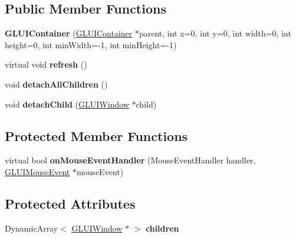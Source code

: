 \subsection*{Public Member Functions}
\begin{DoxyCompactItemize}
\item 
\hypertarget{classCartWheel_1_1GL_1_1GLUIContainer_ac18a8aafca75af543732db4666e20850}{
{\bfseries GLUIContainer} (\hyperlink{classCartWheel_1_1GL_1_1GLUIContainer}{GLUIContainer} $\ast$parent, int x=0, int y=0, int width=0, int height=0, int minWidth=-\/1, int minHeight=-\/1)}
\label{classCartWheel_1_1GL_1_1GLUIContainer_ac18a8aafca75af543732db4666e20850}

\item 
\hypertarget{classCartWheel_1_1GL_1_1GLUIContainer_af9b7add980c193b9f94497f17c7be3d4}{
virtual void {\bfseries refresh} ()}
\label{classCartWheel_1_1GL_1_1GLUIContainer_af9b7add980c193b9f94497f17c7be3d4}

\item 
\hypertarget{classCartWheel_1_1GL_1_1GLUIContainer_a763e61bda63a040ab3fd6d48ff1739cc}{
void {\bfseries detachAllChildren} ()}
\label{classCartWheel_1_1GL_1_1GLUIContainer_a763e61bda63a040ab3fd6d48ff1739cc}

\item 
\hypertarget{classCartWheel_1_1GL_1_1GLUIContainer_a06efdb36829b9aaec2fd39b2e089737f}{
void {\bfseries detachChild} (\hyperlink{classCartWheel_1_1GL_1_1GLUIWindow}{GLUIWindow} $\ast$child)}
\label{classCartWheel_1_1GL_1_1GLUIContainer_a06efdb36829b9aaec2fd39b2e089737f}

\end{DoxyCompactItemize}
\subsection*{Protected Member Functions}
\begin{DoxyCompactItemize}
\item 
\hypertarget{classCartWheel_1_1GL_1_1GLUIContainer_a742e4a4cf67a76c8f439b3fa9016f9a4}{
virtual bool {\bfseries onMouseEventHandler} (MouseEventHandler handler, \hyperlink{classCartWheel_1_1GL_1_1GLUIMouseEvent}{GLUIMouseEvent} $\ast$mouseEvent)}
\label{classCartWheel_1_1GL_1_1GLUIContainer_a742e4a4cf67a76c8f439b3fa9016f9a4}

\end{DoxyCompactItemize}
\subsection*{Protected Attributes}
\begin{DoxyCompactItemize}
\item 
\hypertarget{classCartWheel_1_1GL_1_1GLUIContainer_ac1d0b2eff8c03347deeccba5a9de96c3}{
DynamicArray$<$ \hyperlink{classCartWheel_1_1GL_1_1GLUIWindow}{GLUIWindow} $\ast$ $>$ {\bfseries children}}
\label{classCartWheel_1_1GL_1_1GLUIContainer_ac1d0b2eff8c03347deeccba5a9de96c3}

\end{DoxyCompactItemize}
